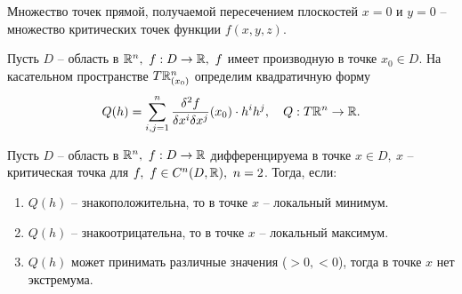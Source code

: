 \begin{note}
    Множество точек прямой, получаемой пересечением плоскостей $x = 0$ и $y = 0$ -- множество критических точек функции $f(x,y,z)$.
\end{note}

\begin{definition}
    Пусть $ D $ -- область в $ \R^n, \ f: D \rightarrow\R, \ f $ имеет производную в точке $ x_0 \in D $. На касательном пространстве $ T\mathbb{R}_{(x_0)}^n $ определим квадратичную форму
    \[
        Q(h) = \sum_{i,j = 1}^{n}\frac{\delta^2f}{\delta x^i\delta x^j}(x_0)\cdot h^ih^j,\quad Q:T\mathbb{R}^n \rightarrow \mathbb{R}.
    \]
\end{definition}

\begin{theorem}
    Пусть $D$ -- область в $\mathbb{R}^n, \ f: D \rightarrow \mathbb{R}$ дифференцируема в точке $x \in D, \ x$ -- критическая точка для $f, \ f \in C^n(D,\mathbb{R}), \ n = 2$. Тогда, если:
    \begin{enumerate}
        \item $Q(h)$ -- знакоположительна, то в точке $x$ -- локальный минимум.
        \item $Q(h)$ -- знакоотрицательна, то в точке $x$ -- локальный максимум.
        \item $Q(h)$ может принимать различные значения ($>0, < 0$), тогда в точке $x$ нет экстремума.
    \end{enumerate}
\end{theorem}

